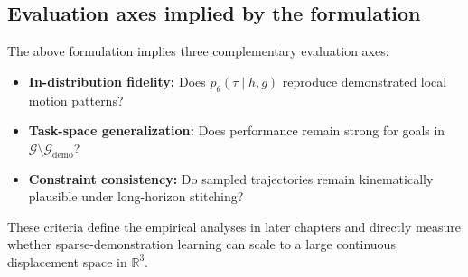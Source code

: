 \subsection{Evaluation axes implied by the formulation}

The above formulation implies three complementary evaluation axes:
\begin{itemize}
    \item \textbf{In-distribution fidelity:} Does $p_{\theta}(\tau\mid h,g)$ reproduce demonstrated local motion patterns?
    \item \textbf{Task-space generalization:} Does performance remain strong for goals in $\mathcal{G}\setminus\mathcal{G}_{\mathrm{demo}}$?
    \item \textbf{Constraint consistency:} Do sampled trajectories remain kinematically plausible under long-horizon stitching?
\end{itemize}

These criteria define the empirical analyses in later chapters and directly measure whether sparse-demonstration learning can scale to a large continuous displacement space in $\mathbb{R}^3$.
